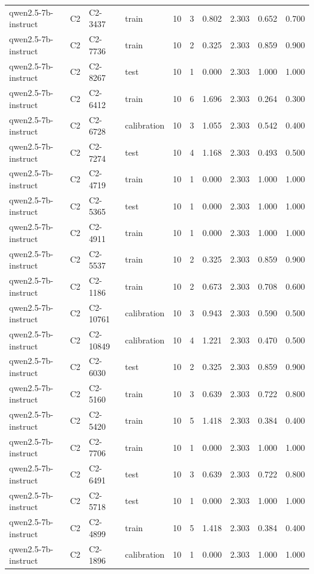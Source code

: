 \begin{table}
\begin{tabular}{llllrrrrrr}
qwen2.5-7b-instruct & C2 & C2-3437 & train & 10 & 3 & 0.802 & 2.303 & 0.652 & 0.700 \\
qwen2.5-7b-instruct & C2 & C2-7736 & train & 10 & 2 & 0.325 & 2.303 & 0.859 & 0.900 \\
qwen2.5-7b-instruct & C2 & C2-8267 & test & 10 & 1 & 0.000 & 2.303 & 1.000 & 1.000 \\
qwen2.5-7b-instruct & C2 & C2-6412 & train & 10 & 6 & 1.696 & 2.303 & 0.264 & 0.300 \\
qwen2.5-7b-instruct & C2 & C2-6728 & calibration & 10 & 3 & 1.055 & 2.303 & 0.542 & 0.400 \\
qwen2.5-7b-instruct & C2 & C2-7274 & test & 10 & 4 & 1.168 & 2.303 & 0.493 & 0.500 \\
qwen2.5-7b-instruct & C2 & C2-4719 & train & 10 & 1 & 0.000 & 2.303 & 1.000 & 1.000 \\
qwen2.5-7b-instruct & C2 & C2-5365 & test & 10 & 1 & 0.000 & 2.303 & 1.000 & 1.000 \\
qwen2.5-7b-instruct & C2 & C2-4911 & train & 10 & 1 & 0.000 & 2.303 & 1.000 & 1.000 \\
qwen2.5-7b-instruct & C2 & C2-5537 & train & 10 & 2 & 0.325 & 2.303 & 0.859 & 0.900 \\
qwen2.5-7b-instruct & C2 & C2-1186 & train & 10 & 2 & 0.673 & 2.303 & 0.708 & 0.600 \\
qwen2.5-7b-instruct & C2 & C2-10761 & calibration & 10 & 3 & 0.943 & 2.303 & 0.590 & 0.500 \\
qwen2.5-7b-instruct & C2 & C2-10849 & calibration & 10 & 4 & 1.221 & 2.303 & 0.470 & 0.500 \\
qwen2.5-7b-instruct & C2 & C2-6030 & test & 10 & 2 & 0.325 & 2.303 & 0.859 & 0.900 \\
qwen2.5-7b-instruct & C2 & C2-5160 & train & 10 & 3 & 0.639 & 2.303 & 0.722 & 0.800 \\
qwen2.5-7b-instruct & C2 & C2-5420 & train & 10 & 5 & 1.418 & 2.303 & 0.384 & 0.400 \\
qwen2.5-7b-instruct & C2 & C2-7706 & train & 10 & 1 & 0.000 & 2.303 & 1.000 & 1.000 \\
qwen2.5-7b-instruct & C2 & C2-6491 & test & 10 & 3 & 0.639 & 2.303 & 0.722 & 0.800 \\
qwen2.5-7b-instruct & C2 & C2-5718 & test & 10 & 1 & 0.000 & 2.303 & 1.000 & 1.000 \\
qwen2.5-7b-instruct & C2 & C2-4899 & train & 10 & 5 & 1.418 & 2.303 & 0.384 & 0.400 \\
qwen2.5-7b-instruct & C2 & C2-1896 & calibration & 10 & 1 & 0.000 & 2.303 & 1.000 & 1.000 \\

\end{tabular}
\end{table}
